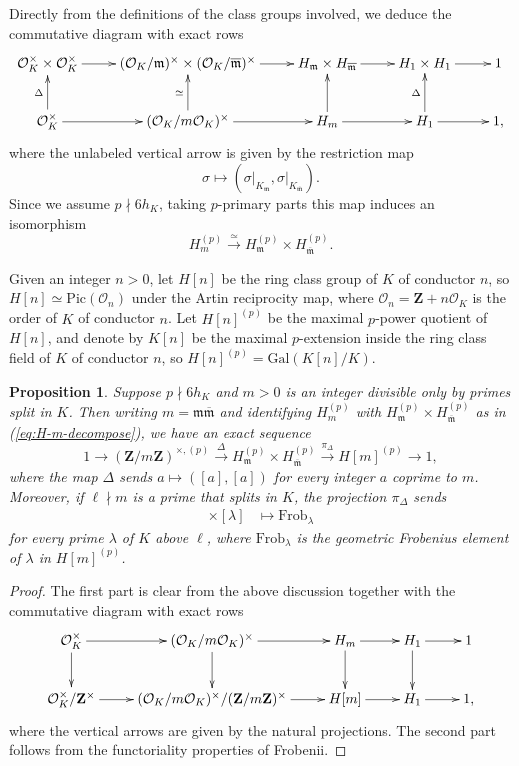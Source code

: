 \documentclass[10pt,letterpaper]{amsart}
\theoremstyle{plain}
\theoremstyle{definition}
\theoremstyle{definition}
\theoremstyle{plain}
\newtheorem{prop}[thm]{Proposition}
\theoremstyle{plain}
\theoremstyle{plain}
\theoremstyle{remark}
\numberwithin{equation}{section}
\newcommand{\fkm}{\mathfrak{m}}
\newcommand{\fkmbar}{\overline{\mathfrak{m}}}
\def\cO{\mathcal O}
\newcommand{\Z}{\mathbf{Z}}
\begin{document}
Directly from the definitions of the class groups involved, we deduce the commutative diagram with exact rows
\[
\xymatrix{
\cO_K^\times\times\cO_K^\times\ar[r]&(\cO_K/\fkm)^\times\times(\cO_K/\overline{\fkm})^\times\ar[r]&H_{\fkm}\times H_{\overline{\fkm}}\ar[r]&H_1\times H_1\ar[r]&1\\
\cO_K^\times\ar[u]^-{\Delta}\ar[r]&(\cO_K/m\cO_K)^\times\ar[u]^{\simeq}\ar[r]&H_{m}\ar[u]\ar[r]&H_1\ar[u]^-{\Delta}\ar[r]&1,
}
\]
where the unlabeled vertical arrow is given by the restriction map 
\[\sigma\mapsto(\sigma\vert_{K_\fkm},\sigma\vert_{K_{\fkmbar}}).
\] 
Since we assume $p\nmid 6h_K$, taking $p$-primary parts this map induces an isomorphism
\begin{equation}\label{eq:H-m-decompose}
H_m^{(p)}\xrightarrow{\simeq} H_{\fkm}^{(p)}\times H_{\fkmbar}^{(p)}.
\end{equation}

Given an integer $n>0$, let $H[n]$ be the ring class group of $K$ of conductor $n$, so 
$H[n]\simeq{\mathrm{Pic}}(\cO_n)$ under the Artin reciprocity map, where $\cO_n=\Z+n\cO_K$ is the order of $K$ of conductor $n$. Let $H[n]^{(p)}$ be the maximal $p$-power quotient of $H[n]$, and denote by $K[n]$ be the maximal $p$-extension inside the ring class field of $K$ of conductor $n$, so $H[n]^{(p)}={\mathrm{Gal}}(K[n]/K)$.

\begin{prop}\label{ringclass} Suppose $p\nmid 6h_K$ and $m>0$ is an integer divisible only by primes split in $K$. Then writing $m=\fkm\fkmbar$ and identifying $H_m^{(p)}$ with $H_\fkm^{(p)}\times H_{\fkmbar}^{(p)}$ as in (\ref{eq:H-m-decompose}), we have an exact sequence
\[
 1\longrightarrow (\Z/m\Z)^{\times, (p)}\overset{\Delta}\longrightarrow H_{\fkm}^{(p)}\times H_{\fkmbar}^{(p)} \overset{\pi_\Delta}\longrightarrow H[m]^{(p)}\longrightarrow 1,
 \]
where the map $\Delta$ sends $a\mapsto([a],[a])$ for every integer $a$ coprime to $m$. Moreover, if $\ell\nmid m$ is a prime that splits in $K$, the projection $\pi_\Delta$ sends 
\begin{align*}
[\lambda]\times[\lambda]&\mapsto \mathrm{Frob}_{\lambda} 
\end{align*}
for every prime $\lambda$ of $K$ above $\ell$, where $\mathrm{Frob}_{\lambda}$ is the geometric Frobenius element of $\lambda$ in $H[m]^{(p)}$. 
\end{prop}

\begin{proof}
The first part is clear from the above discussion  together with the commutative diagram with exact rows
\[
\xymatrix{
\cO_K^\times\ar[r]\ar[d]&(\cO_K/m\cO_K)^\times\ar[r]\ar[d]&H_m\ar[r]\ar[d]&H_1\ar[r]\ar[d]&1\\
\cO_K^\times/\Z^\times\ar[r]&(\cO_K/m\cO_K)^\times/(\Z/m\Z)^\times\ar[r]&H[m]\ar[r]&H_1\ar[r]&1,
}
\]
where the vertical arrows are given by the natural projections. The second part follows from the functoriality properties of Frobenii.
\end{proof}
\end{document}
